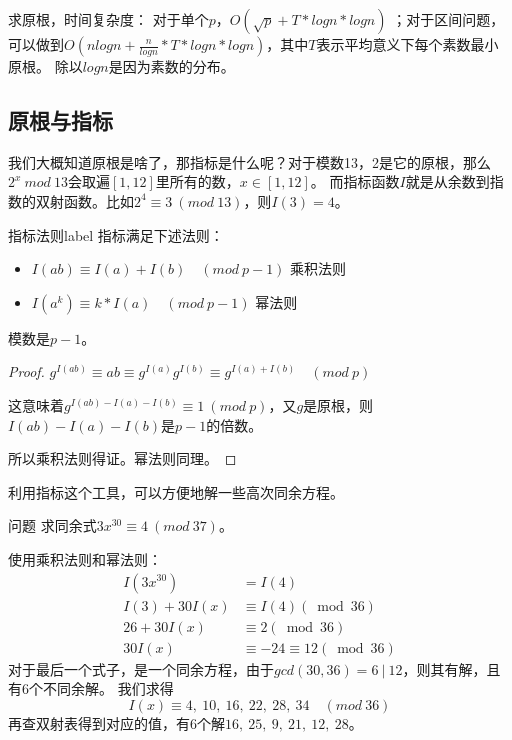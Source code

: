 \vbox{}

{\heiti 求原根，时间复杂度： 对于单个$p$，$O(\sqrt{p} + T*logn*logn)$   ；对于区间问题，可以做到$O(nlogn + \frac{n}{logn}*T*logn*logn)$，其中$T$表示平均意义下每个素数最小原根。
除以$logn$是因为素数的分布。}


\subsection{原根与指标}
我们大概知道原根是啥了，那指标是什么呢？对于模数13，2是它的原根，那么$2^x\ mod \ 13$会取遍$[1,12]$里所有的数，$x\in [1,12]$。
{\heiti 而指标函数$I$就是从余数到指数的双射函数。}比如$2^4\equiv 3\ (mod\ 13)$，则$I(3) = 4$。



\begin{theorem}{指标法则}{label}
	指标满足下述法则：
		\begin{itemize}
			\item $I(ab)\equiv I(a)+I(b) \quad (mod \ p-1)$ \quad  乘积法则
			\item $I(a^k)\equiv k*I(a)  \quad (mod \ p-1)$ \quad  幂法则
		\end{itemize}
\end{theorem}

\begin{note}
	模数是$p-1$。
\end{note}

\begin{proof}
	 $g^{I(ab)}\equiv ab\equiv g^{I(a)}g^{I(b)}\equiv g^{I(a)+I(b)}\quad (mod \ p)$
	
	这意味着$g^{I(ab)-I(a)-I(b)}\equiv 1\ (mod \ p)$，又$g$是原根，则$I(ab)-I(a)-I(b)$是$p-1$的倍数。
	
	所以乘积法则得证。幂法则同理。
\end{proof}

\vbox{}

利用指标这个工具，可以方便地解一些高次同余方程。

\begin{custom}{问题}
求同余式$3x^{30}\equiv 4\ (mod \ 37)$。
\end{custom}

\begin{solution}
	使用乘积法则和幂法则：
$$
\begin{aligned} I\left(3 x^{30}\right) &=I(4) \\ I(3)+30 I(x) & \equiv I(4)(\bmod 36) \\ 26+30 I(x) &\equiv2(\bmod 36) \\ 30 I(x) & \equiv-24\equiv12(\bmod 36) \end{aligned}
$$
对于最后一个式子，是一个同余方程，由于$gcd(30,36)=6\ |\ 12$，则其有解，且有6个不同余解。
我们求得
$$
I(x)\equiv 4,\ 10,\ 16,\ 22,\ 28,\ 34 \quad (mod \ 36)
$$
再查双射表得到对应的值，有6个解$16,\ 25,\ 9,\ 21,\ 12,\ 28$。
\end{solution}

